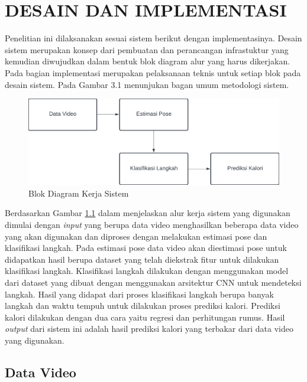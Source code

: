 \chapter{DESAIN DAN IMPLEMENTASI}
\label{chap:desainimplementasi}

Penelitian ini dilaksanakan sesuai sistem berikut dengan implementasinya. Desain sistem merupakan konsep dari pembuatan dan perancangan infrastuktur yang kemudian diwujudkan dalam bentuk blok diagram alur yang harus dikerjakan. Pada bagian implementasi merupakan pelaksanaan teknis untuk setiap blok pada desain sistem. Pada Gambar 3.1 menunjukan bagan umum metodologi sistem.

\begin{figure}[H]
  \centering
  \includegraphics[scale=0.215]{gambar/blok diagram metodologi4.png}
  \caption{Blok Diagram Kerja Sistem}
  \label{fig:BlokDiagram}
\end{figure}

Berdasarkan Gambar \ref{fig:BlokDiagram} dalam menjelaskan alur kerja sistem yang digunakan dimulai dengan \emph{input} yang berupa data video menghasilkan beberapa data video yang akan digunakan dan diproses dengan melakukan estimasi pose dan klasifikasi langkah. Pada estimasi pose data video akan diestimasi pose untuk didapatkan hasil berupa dataset yang telah diekstrak fitur untuk dilakukan klasifikasi langkah. Klasifikasi langkah dilakukan dengan menggunakan model dari dataset yang dibuat dengan menggunakan arsitektur CNN untuk mendeteksi langkah. Hasil yang didapat dari proses klasifikasi langkah berupa banyak langkah dan waktu tempuh untuk dilakukan proses prediksi kalori. Prediksi kalori dilakukan dengan dua cara yaitu regresi dan perhitungan rumus. Hasil \emph{output} dari sistem ini adalah hasil prediksi kalori yang terbakar dari data video yang digunakan.

\section{Data Video}
\label{sec:PengambilanData}

